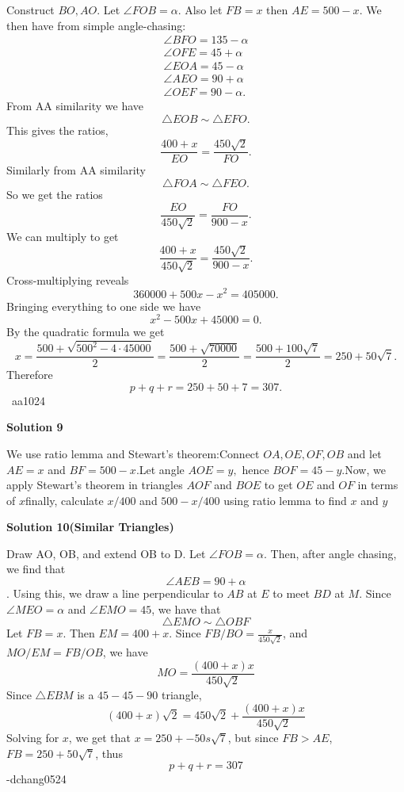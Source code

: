 \begin{enumerate}
Construct $BO, AO.$ Let $\angle{FOB} = \alpha.$ Also let $FB = x$ then $AE = 500-x.$ We then have from simple angle-chasing:
 \begin{align*} \angle{BFO} = 135 - \alpha \\ \angle{OFE} = 45 + \alpha \\ \angle{EOA} = 45 - \alpha \\ \angle{AEO} = 90 + \alpha \\ \angle{OEF} = 90 - \alpha. \end{align*}
From AA similarity we have 
 \[\triangle{EOB} \sim \triangle{EFO}.\] This gives the ratios, 
 \[\dfrac{400 + x}{EO} = \dfrac{450\sqrt{2}}{FO}.\]Similarly from AA similarity 
 \[\triangle{FOA} \sim \triangle{FEO}.\] So we get the ratios 
 \[\dfrac{EO}{450\sqrt{2}} = \dfrac{FO}{900-x}.\] We can multiply to get 
 \[\dfrac{400 + x}{450\sqrt{2}} = \dfrac{450\sqrt{2}}{900 - x}.\] Cross-multiplying reveals
 \[360000 + 500x - x^2 = 405000.\] Bringing everything to one side we have 
 \[x^2 - 500x + 45000 = 0.\] By the quadratic formula we get 
 \[x = \dfrac{500 + \sqrt{500^2 - 4\cdot45000}}{2} = \dfrac{500 + \sqrt{70000}}{2} = \dfrac{500 + 100\sqrt{7}}{2} = 250 + 50\sqrt{7}.\]Therefore 
 \[p+q+r = 250 + 50 + 7 = \boxed{307}.\]~aa1024

 


 



\textbf{Solution 9}

We use ratio lemma and Stewart's theorem:Connect $OA, OE, OF, OB$ and let $AE = x$ and $BF = 500 - x.$Let angle $AOE = y,$ hence $BOF = 45 - y.$Now, we apply Stewart's theorem in triangles $AOF$ and $BOE$ to get $OE$ and $OF$ in terms of $x$finally, calculate $x/400$ and $500-x/400$ using ratio lemma to find $x$ and $y$




\textbf{Solution 10(Similar Triangles)}

Draw AO, OB, and extend OB to D. Let $\angle{FOB} = \alpha.$ Then, after angle chasing, we find that 
 \[\angle{AEB} = 90 + \alpha\]. Using this, we draw a line perpendicular to $AB$ at $E$ to meet $BD$ at $M$. Since $\angle{MEO} = \alpha$ and $\angle{EMO} = 45$, we have that 
 \[\triangle{EMO} \sim \triangle{OBF}\]Let $FB = x$. Then $EM = 400+x$. Since $FB/BO = \frac{x}{450\sqrt{2}}$, and $MO/EM = FB/OB$, we have 
 \[MO = \frac{(400+x)x}{450\sqrt{2}}\] Since $\triangle{EBM}$ is a $45-45-90$ triangle, 
 \[(400+x)\sqrt{2} = 450 \sqrt{2} + \frac{(400+x)x}{450\sqrt{2}}\]Solving for $x$, we get that $x=250 +- 50s\sqrt{7}$, but since $FB>AE$, $FB = 250+50\sqrt{7}$, thus 
 \[p+q+r=\boxed{307}\]-dchang0524


\end{enumerate}
